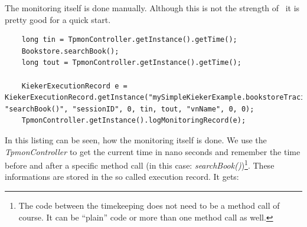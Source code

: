        \setJavaCodeListing
%       
%       
%       
      The monitoring itself is done manually. Although this is not the strength of \Kieker\ it is pretty good for a quick start.
      \lstset{caption=Cutting from Bookstore.java, label=listing:cuttingBookstore}
      \begin{lstlisting}
	long tin = TpmonController.getInstance().getTime();
	Bookstore.searchBook();
	long tout = TpmonController.getInstance().getTime();

	KiekerExecutionRecord e = KiekerExecutionRecord.getInstance("mySimpleKiekerExample.bookstoreTracing.Bookstore", "searchBook()", "sessionID", 0, tin, tout, "vnName", 0, 0);
	TpmonController.getInstance().logMonitoringRecord(e);
      \end{lstlisting}
      In this listing can be seen, how the monitoring itself is done. We use the \textit{TpmonController} to get the current time in nano seconds and remember the time before and after a specific method call (in this case: \textit{searchBook()})\footnote{The code between the timekeeping does not need to be a method call of course. It can be ``plain'' code or more than one method call as well.}. These informations are stored in the so called execution record. It gets:
